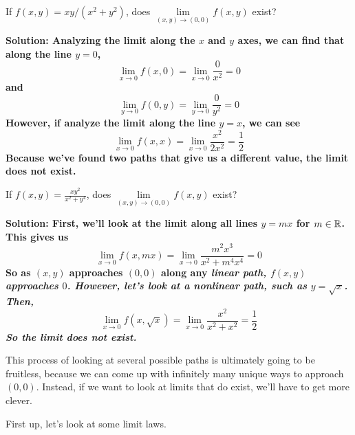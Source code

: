 \begin{example}
    If \(f(x,y)=xy/(x^2+y^2)\), does \(\lim\limits_{(x,y)\to(0,0)}f(x,y)\) exist?\par\bf{Solution: }Analyzing the limit along the \(x\) and \(y\) axes, we can find that along the line \(y=0\),
    \[ \lim_{x\to 0}f(x, 0) = \lim_{x\to 0}\frac{0}{x^2}=0\]
    and
    \[ \lim_{y\to 0}f(0, y) = \lim_{y\to 0}\frac{0}{y^2}=0\]
    However, if  analyze the limit along the line \(y=x\), we can see
    \[ \lim_{x\to 0}f(x, x) = \lim_{x\to 0}\frac{x^2}{2x^2}=\frac{1}{2}\]
    Because we've found two paths that give us a different value, the limit does not exist.
\end{example}
\begin{example}
    If \(f(x,y)=\frac{xy^2}{x^2+y^4}\), does \(\lim\limits_{(x,y)\to(0,0)}f(x,y)\) exist?\par\bf{Solution: }First, we'll look at the limit along all lines \(y=mx\) for \(m\in\mathbb{R}\). This gives us
    \[ \lim_{x\to 0}f(x, mx) = \lim_{x\to 0}\frac{m^2x^3}{x^2+m^4x^4} = 0\]
    So as \((x,y)\) approaches \((0,0)\) along any \it{linear} path, \(f(x,y)\) approaches \(0\). However, let's look at a nonlinear path, such as \(y=\sqrt x\). Then,
    \[ \lim_{x\to 0}f(x, \sqrt x) = \lim_{x\to 0}\frac{x^2}{x^2+x^2} = \frac{1}{2} \]
    So the limit does not exist.
\end{example}
This process of looking at several possible paths is ultimately going to be fruitless, because we can come up with infinitely many unique ways to approach \((0,0)\). Instead, if we want to look at limits that do exist, we'll have to get more clever.\par
First up, let's look at some limit laws. 
